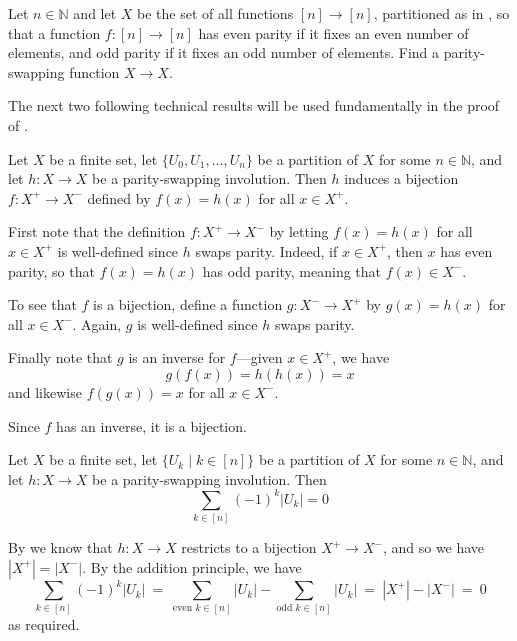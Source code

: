 \begin{exercise}
Let $n \in \mathbb{N}$ and let $X$ be the set of all functions $[n] \to [n]$, partitioned as in , so that a function $f : [n] \to [n]$ has even parity if it fixes an even number of elements, and odd parity if it fixes an odd number of elements. Find a parity-swapping function $X \to X$.
\end{exercise}

The next two following technical results will be used fundamentally in the proof of .

\begin{lemma}
\label{lemParitySwappingInvolutionInducesBijectionFromEvenToOdd}
Let $X$ be a finite set, let $\{ U_0, U_1, \dots, U_n \}$ be a partition of $X$ for some $n \in \mathbb{N}$, and let $h : X \to X$ be a parity-swapping involution. Then $h$ induces a bijection $f : X^+ \to X^-$ defined by $f(x)=h(x)$ for all $x \in X^+$.
\end{lemma}

\begin{cproof}
First note that the definition $f : X^+ \to X^-$ by letting $f(x)=h(x)$ for all $x \in X^+$ is well-defined since $h$ swaps parity. Indeed, if $x \in X^+$, then $x$ has even parity, so that $f(x) = h(x)$ has odd parity, meaning that $f(x) \in X^-$.

To see that $f$ is a bijection, define a function $g : X^- \to X^+$ by $g(x) = h(x)$ for all $x \in X^-$. Again, $g$ is well-defined since $h$ swaps parity.

Finally note that $g$ is an inverse for $f$---given $x \in X^+$, we have
\[ g(f(x)) = h(h(x)) = x \]
and likewise $f(g(x)) = x$ for all $x \in X^-$.

Since $f$ has an inverse, it is a bijection.
\end{cproof}

\begin{lemma}
\label{lemParitySwappingInvolutionGivesZero}
Let $X$ be a finite set, let $\{ U_k \mid k \in [n] \}$ be a partition of $X$ for some $n \in \mathbb{N}$, and let $h : X \to X$ be a parity-swapping involution. Then
\[ \sum_{k \in [n]} (-1)^k |U_k| = 0 \]
\end{lemma}

\begin{cproof}
By  we know that $h : X \to X$ restricts to a bijection $X^+ \to X^-$, and so we have $|X^+| = |X^-|$. By the addition principle, we have
\[ \sum_{k \in [n]} (-1)^k |U_k| ~=~ \sum_{\text{even } k \in [n]} |U_k| - \sum_{\text{odd } k \in [n]} |U_k| ~=~ |X^+| - |X^-| ~=~ 0\]
as required.
\end{cproof}

